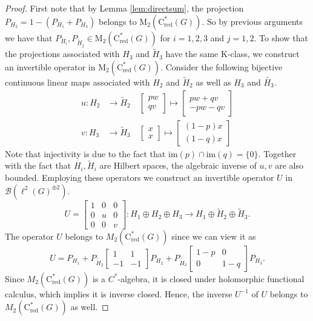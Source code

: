 \documentclass[a4paper,leqno,12pt]{article}
\numberwithin{equation}{section}
\theoremstyle{plain}
\theoremstyle{definition}
\theoremstyle{remark}
\newcommand{\Csr}{\mathrm{C}^*_{\text{red}}}
\begin{document}
	\begin{proof}
		First note that by Lemma \ref{lem:directsum}, the projection $P_{H_2}=1-(P_{H_1}+P_{H_3})$ belongs to $\mathrm M_2(\Csr(G))$. So by previous arguments we have that $P_{H_i}, P_{\tilde H_j}\in \mathrm M_2(\Csr(G))$ for $i=1,2,3$ and $j=1,2$.  
		To show that the projections associated with $H_3$ and $\tilde{H}_3$ have the same K-class, we construct an invertible operator in $\mathrm M_2(\Csr(G))$. Consider the following bijective continuous linear maps associated with $H_2$ and $\tilde{H}_2$ as well as $H_3$ and $\tilde{H_3}$.
		\begin{align*}
		u: H_2&\rightarrow \tilde H_2 \quad \begin{bmatrix}pw\\ qv\end{bmatrix}\mapsto \begin{bmatrix}pw+qv\\-pw-qv\end{bmatrix}
		\\
		v: H_3&\rightarrow \tilde H_3 \quad \begin{bmatrix}x \\ x\end{bmatrix}\mapsto \begin{bmatrix}(1-p)x\\(1-q)x\end{bmatrix}
		\end{align*}
	    Note that injectivity is due to the fact that $\mathrm{im}(p)\cap\mathrm{im}(q)=\{0\}$.
	    Together with the fact that $H_i, \tilde H_i$ are Hilbert spaces, the algebraic inverse of $u,v$ are also bounded. 
	    Employing these operators we construct an invertible operator $U$ in 
	    $\mathcal{B}(\ell^2(G)^{\oplus 2})$.
	    \[
	    	U=\begin{bmatrix}1 & 0 & 0\\ 0 & u & 0 \\ 0 & 0 & v\end{bmatrix}: H_1\oplus H_2\oplus H_3\rightarrow H_1\oplus\tilde H_2\oplus\tilde H_3.
	    \]
The operator $U$ belongs to $M_2(\Csr(G))$ since we can view it as
\[
U = P_{H_1} + P_{\tilde{H}_2} \begin{bmatrix} 1 & 1 \\ -1 & -1 \end{bmatrix} P_{H_2} + P_{\tilde{H}_3} \begin{bmatrix} 1-p & 0 \\ 0 & 1-q \end{bmatrix} P_{H_3}.
\]
Since $M_2(\Csr(G))$ is a $C^*$-algebra, it is closed under holomorphic functional calculus, which implies it is inverse closed. Hence, the inverse $U^{-1}$ of $U$ belongs to $M_2(\Csr(G))$ as well. 


\end{proof}
\end{document}
